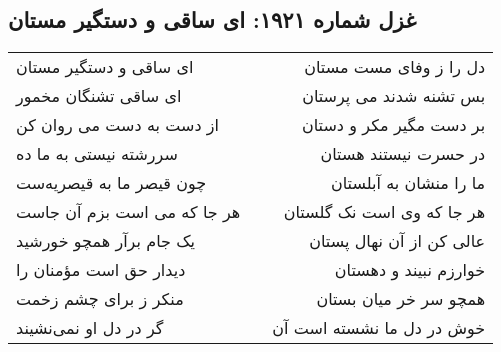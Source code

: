 \begin{center}
\section*{غزل شماره ۱۹۲۱: ای ساقی و دستگیر مستان}
\label{sec:1921}
\begin{longtable}{l p{0.5cm} r}
ای ساقی و دستگیر مستان
&&
دل را ز وفای مست مستان
\\
ای ساقی تشنگان مخمور
&&
بس تشنه شدند می پرستان
\\
از دست به دست می روان کن
&&
بر دست مگیر مکر و دستان
\\
سررشته نیستی به ما ده
&&
در حسرت نیستند هستان
\\
چون قیصر ما به قیصریه‌ست
&&
ما را منشان به آبلستان
\\
هر جا که می است بزم آن جاست
&&
هر جا که وی است نک گلستان
\\
یک جام برآر همچو خورشید
&&
عالی کن از آن نهال پستان
\\
دیدار حق است مؤمنان را
&&
خوارزم نبیند و دهستان
\\
منکر ز برای چشم زخمت
&&
همچو سر خر میان بستان
\\
گر در دل او نمی‌نشیند
&&
خوش در دل ما نشسته است آن
\\
\end{longtable}
\end{center}

